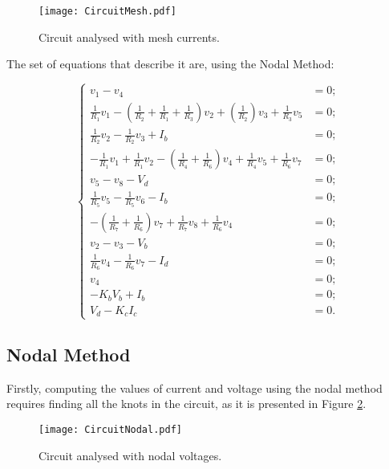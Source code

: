 \begin{figure}[h] \centering
\texttt{[image: CircuitMesh.pdf]}
\caption{Circuit analysed with mesh currents.}
\label{fig:Circuit_Passo2}
\end{figure}

The set of equations that describe it are, using the Nodal Method:

\begin{equation}
\begin{cases}
	v_1 - v_4 &= 0;																				  \\
	\frac{1}{R_1}v_1 - (\frac{1}{R_2}+\frac{1}{R_1}+\frac{1}{R_3})v_2 + (\frac{1}{R_2})v_3 + \frac{1}{R_3}v_5 &= 0; \\
  	\frac{1}{R_2}v_2 - \frac{1}{R_2}v_3+ I_b &= 0;													  \\
  	-\frac{1}{R_1}v_1 + \frac{1}{R_1}v_2 - (\frac{1}{R_4}+\frac{1}{R_6})v_4 + \frac{1}{R_4}v_5 + \frac{1}{R_6}v_7 &= 0;			  																	  \\
	v_5 - v_8 - V_d &= 0;																			  \\
  	\frac{1}{R_5}v_5 - \frac{1}{R_5}v_6 - I_b &= 0;												  	  \\
  	-(\frac{1}{R_7}+\frac{1}{R_6})v_7 + \frac{1}{R_7}v_8 + \frac{1}{R_6}v_4 &= 0;					  \\
	v_2 - v_3 - V_b &= 0;																			  \\
  	\frac{1}{R_6}v_4 - \frac{1}{R_6}v_7 - I_d &= 0;													  \\
  	v_4 &= 0;																						  \\
  	-K_bV_b + I_b &= 0;																				  \\
  	V_d - K_cI_c &= 0.
\end{cases}
\end{equation}



\subsection{Nodal Method}

Firstly, computing the values of current and voltage using the nodal method requires finding all the knots in the circuit, as it is presented in Figure \ref{fig:Circuit_Nodal}.
\begin{figure}[h] \centering
\texttt{[image: CircuitNodal.pdf]}
\caption{Circuit analysed with nodal voltages.}
\label{fig:Circuit_Nodal}
\end{figure}


